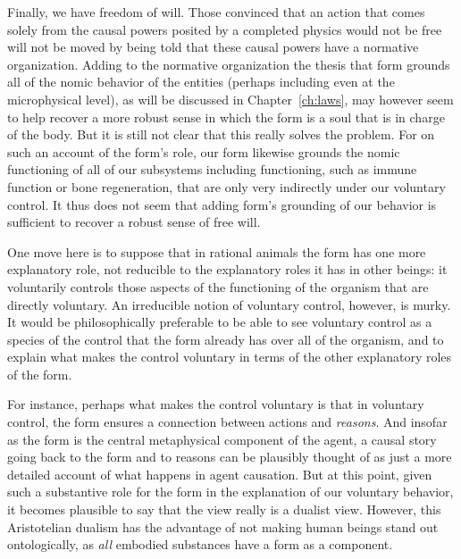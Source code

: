 Finally, we have freedom of will. Those convinced that an action that comes solely from the causal powers posited by a completed
physics would not be free will not be moved by being told that these causal powers have a normative organization. 
Adding to the normative organization the thesis that form grounds all of the nomic behavior of the entities (perhaps including 
even at the microphysical level), as will be discussed in Chapter~\ref{ch:laws}, may however seem to help recover a more robust sense in which the form is a soul that is in 
charge of the body. But it is still not clear that this really solves the problem. For on such an account
of the form's role, our form likewise grounds 
the nomic functioning of all of our subsystems including functioning, such as immune function or bone regeneration, that are 
only very indirectly under our voluntary control. It thus does not seem that adding form's grounding of our behavior is 
sufficient to recover a robust sense of free will.

One move here is to suppose that in rational animals the form has one more explanatory role, not reducible to the explanatory
roles it has in other beings: it voluntarily controls those aspects of the functioning of the organism that are directly
voluntary. An irreducible notion of voluntary control, however, is murky. It would be philosophically preferable to be able to see 
voluntary control as a species of the control that the form already has over all of the organism, and to explain what makes the 
control voluntary in terms of the other explanatory roles of the form. 

For instance, perhaps what makes the control voluntary is that in voluntary control, the form ensures a connection between
actions and \textit{reasons}. And insofar as the form is the central metaphysical component of the agent, a causal story 
going back to the form and to reasons can be plausibly thought of as just a more detailed account of what happens in 
agent causation. But at this point, given such a substantive role for the form in the explanation of our voluntary
behavior, it becomes plausible to say that the view really is a dualist view. However, this Aristotelian dualism
has the advantage of not making human beings stand out ontologically, as \textit{all} embodied substances
have a form as a component.

